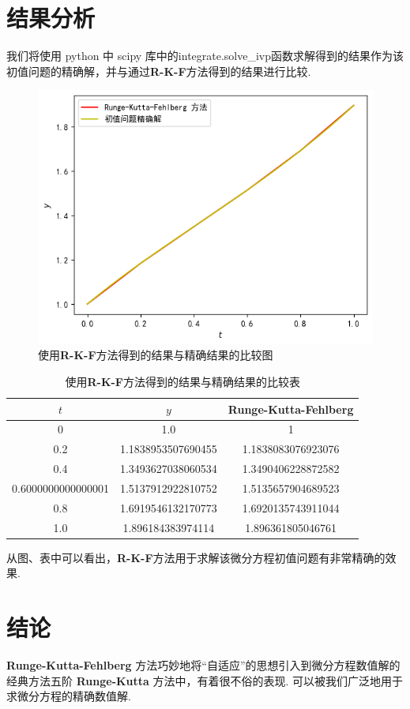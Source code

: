 \documentclass[UTF8,ctexart,a4paper,11pt,openany]{article}
\theoremstyle{definition}
\begin{document}
\section{结果分析}
    我们将使用 python 中 scipy 库中的integrate.solve\_ivp函数求解得到的结果作为该初值问题的精确解，并与通过\textbf{R-K-F}方法得到的结果进行比较. \par
    \begin{figure}[H]
        \centering
        \includegraphics[width=0.6\linewidth]{pics/exam.png}
        \caption{使用\textbf{R-K-F}方法得到的结果与精确结果的比较图}
    \end{figure}
    \begin{table}[H]
        \centering
        \begin{tabular}{ccc} %
            \toprule
            $t$   & $y$                   & Runge-Kutta-Fehlberg        \\ \midrule
            0 & 1.0 & 1 \\
            0.2 & 1.1838953507690455 & 1.1838083076923076 \\
            0.4 & 1.3493627038060534 & 1.3490406228872582 \\
            0.6000000000000001 & 1.5137912922810752 & 1.5135657904689523 \\
            0.8 & 1.6919546132170773 & 1.6920135743911044 \\
            1.0 & 1.896184383974114 & 1.896361805046761\\ \bottomrule
        \end{tabular}
        \caption{使用\textbf{R-K-F}方法得到的结果与精确结果的比较表}
    \end{table}
    \indent 从图、表中可以看出，\textbf{R-K-F}方法用于求解该微分方程初值问题有非常精确的效果. 
\section{结论}
    \textbf{Runge-Kutta-Fehlberg} 方法巧妙地将“自适应”的思想引入到微分方程数值解的经典方法五阶 \textbf{Runge-Kutta} 方法中，有着很不俗的表现. 可以被我们广泛地用于求微分方程的精确数值解. 
\clearpage
\end{document}
